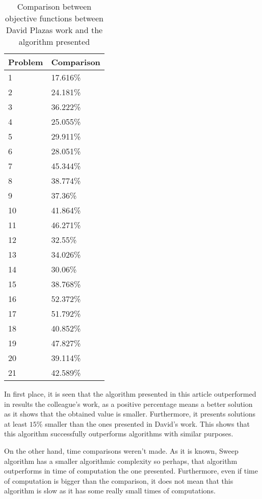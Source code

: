 \documentclass[10pt,twoside]{article}
\begin{document}
\begin{table}[]
\centering
\begin{tabular}{ll}
\hline
Problem & Comparison \\ \hline
1       & 17.616\%   \\
2       & 24.181\%   \\
3       & 36.222\%   \\
4       & 25.055\%   \\
5       & 29.911\%   \\
6       & 28.051\%   \\
7       & 45.344\%   \\
8       & 38.774\%   \\
9       & 37.36\%    \\
10      & 41.864\%   \\
11      & 46.271\%   \\
12      & 32.55\%    \\
13      & 34.026\%   \\
14      & 30.06\%    \\
15      & 38.768\%   \\
16      & 52.372\%   \\
17      & 51.792\%   \\
18      & 40.852\%   \\
19      & 47.827\%   \\
20      & 39.114\%   \\
21      & 42.589\%   \\ \hline
\end{tabular}
\caption{Comparison between objective functions between David Plazas work and the algorithm presented}
\label{t_pl}
\end{table}

In first place, it is seen that the algorithm presented in this
article outperformed in results the colleague's work, as a positive
percentage means a better solution as it shows that the obtained value
is smaller. Furthermore, it presents solutions at least $15\%$ smaller
than the ones presented in David's work. This shows that this
algorithm successfully outperforms algorithms with similar purposes.

On the other hand, time comparisons weren't made. As it is known,
Sweep algorithm has a smaller algorithmic complexity so perhaps, that
algorithm outperforms in time of computation the one
presented. Furthermore, even if time of computation is bigger than the
comparison, it does not mean that this algorithm is slow as it has
some really small times of computations.
\end{document}
